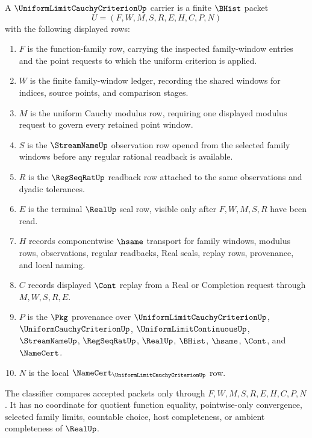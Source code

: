 \begin{definition}
\label{def:uniform-limit-cauchy-criterion-carrier}
A $\UniformLimitCauchyCriterionUp$ carrier is a finite $\BHist$ packet
$$
U=(F,W,M,S,R,E,H,C,P,N)
$$
with the following displayed rows:
\begin{enumerate}
\item $F$ is the function-family row, carrying the inspected family-window entries and the point requests to which the uniform criterion is applied.
\item $W$ is the finite family-window ledger, recording the shared windows for indices, source points, and comparison stages.
\item $M$ is the uniform Cauchy modulus row, requiring one displayed modulus request to govern every retained point window.
\item $S$ is the $\StreamNameUp$ observation row opened from the selected family windows before any regular rational readback is available.
\item $R$ is the $\RegSeqRatUp$ readback row attached to the same observations and dyadic tolerances.
\item $E$ is the terminal $\RealUp$ seal row, visible only after $F,W,M,S,R$ have been read.
\item $H$ records componentwise $\hsame$ transport for family windows, modulus rows, observations, regular readbacks, Real seals, replay rows, provenance, and local naming.
\item $C$ records displayed $\Cont$ replay from a Real or Completion request through $M,W,S,R,E$.
\item $P$ is the $\Pkg$ provenance over $\UniformLimitCauchyCriterionUp$, $\UniformCauchyCriterionUp$, $\UniformLimitContinuousUp$, $\StreamNameUp$, $\RegSeqRatUp$, $\RealUp$, $\BHist$, $\hsame$, $\Cont$, and $\NameCert$.
\item $N$ is the local $\NameCert_{\UniformLimitCauchyCriterionUp}$ row.
\end{enumerate}
The classifier compares accepted packets only through $F,W,M,S,R,E,H,C,P,N$. It has no coordinate for quotient function equality, pointwise-only convergence, selected family limits, countable choice, host completeness, or ambient completeness of $\RealUp$.
\end{definition}

